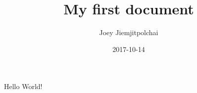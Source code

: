 \documentclass{article}
\title{My first document}
\date{2017-10-14}
\author{Joey Jiemjitpolchai}
\begin{document}
    \maketitle
    \newpage
    
	Hello World!
\end{document}
